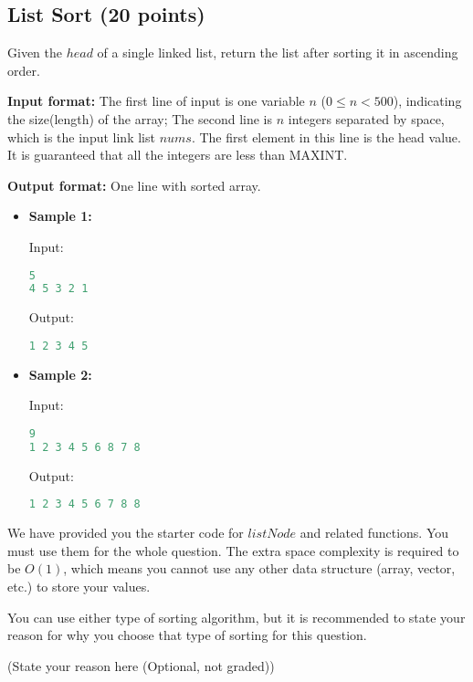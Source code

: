 \documentclass[11pt]{exam}
\begin{document}
\subsection{List Sort (20 points)}

Given the $head$ of a single linked list, return the list after sorting it in ascending order.

\textbf{Input format:} The first line of input is one variable $n$ ($0 \leq n < 500$), indicating the size(length) of the array; The second line is $n$ integers separated by space, which is the input link list $nums$. The first element in this line is the head value. It is guaranteed that all the integers are less than MAXINT. 

\textbf{Output format:} One line with sorted array.

\begin{itemize}
\item \textbf{Sample 1:}

Input:
\begin{lstlisting}[language=c++]
5
4 5 3 2 1
\end{lstlisting}

Output:
\begin{lstlisting}[language=c++]
1 2 3 4 5
\end{lstlisting}


\item \textbf{Sample 2:}

Input:
\begin{lstlisting}[language=c++]
9
1 2 3 4 5 6 8 7 8
\end{lstlisting}

Output:
\begin{lstlisting}[language=c++]
1 2 3 4 5 6 7 8 8
\end{lstlisting}
\end{itemize}

We have provided you the starter code for $listNode$ and related functions. You must use them for the whole question. The extra space complexity is required to be $O(1)$, which means you cannot use any other data structure (array, vector, etc.) to store your values.

You can use either type of sorting algorithm, but it is recommended to state your reason for why you choose that type of sorting for this question.

\begin{solution}
(State your reason here (Optional, not graded))
\end{solution}
\end{document}
